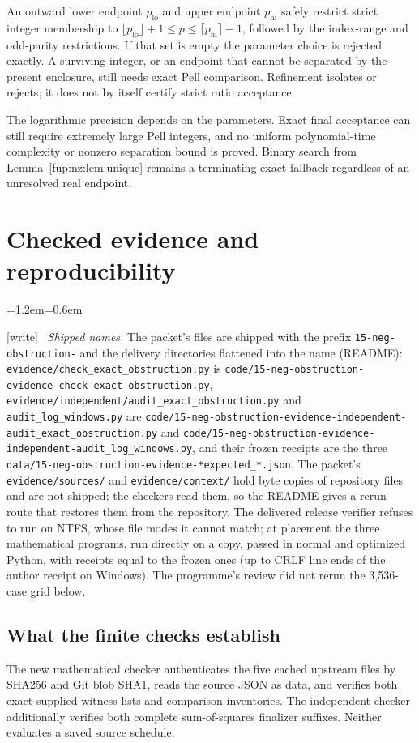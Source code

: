 \documentclass[11pt,letterpaper]{article}
\theoremstyle{definition}\newtheorem{definition}[theorem]{Definition}
\theoremstyle{remark}\newtheorem{remark}[theorem]{Remark}
\newcommand{\wtag}{\textup{[write]}}
\newenvironment{writenote}{\par\smallskip\begin{list}{}{\leftmargin=1.2em\rightmargin=0.6em}\item[]\small\wtag\ }{\end{list}\smallskip}
\newcommand{\rw}[1]{\nolinkurl{#1}}%
\begin{document}
An outward lower endpoint $p_{\mathrm{lo}}$ and upper endpoint $p_{\mathrm{hi}}$ safely restrict strict integer membership to $\lfloor p_{\mathrm{lo}}\rfloor+1\le p\le\lceil p_{\mathrm{hi}}\rceil-1$, followed by the index-range and odd-parity restrictions. If that set is empty the parameter choice is rejected exactly. A surviving integer, or an endpoint that cannot be separated by the present enclosure, still needs exact Pell comparison. Refinement isolates or rejects; it does not by itself certify strict ratio acceptance.

The logarithmic precision depends on the parameters. Exact final acceptance can still require extremely large Pell integers, and no uniform polynomial-time complexity or nonzero separation bound is proved. Binary search from Lemma~\ref{fup:nz:lem:unique} remains a terminating exact fallback regardless of an unresolved real endpoint.

\section{Checked evidence and reproducibility}\label{fup:nz:sec:checks}
\begin{writenote}
\emph{Shipped names.} The packet's files are shipped with the prefix \texttt{15-neg-obstruction-} and the delivery directories flattened into the name (README): \rw{evidence/check_exact_obstruction.py} is \rw{code/15-neg-obstruction-evidence-check_exact_obstruction.py}, \rw{evidence/independent/audit_exact_obstruction.py} and \rw{audit_log_windows.py} are \rw{code/15-neg-obstruction-evidence-independent-audit_exact_obstruction.py} and \rw{code/15-neg-obstruction-evidence-independent-audit_log_windows.py}, and their frozen receipts are the three \rw{data/15-neg-obstruction-evidence-*expected_*.json}. The packet's \rw{evidence/sources/} and \rw{evidence/context/} hold byte copies of repository files and are not shipped; the checkers read them, so the README gives a rerun route that restores them from the repository. The delivered release verifier refuses to run on NTFS, whose file modes it cannot match; at placement the three mathematical programs, run directly on a copy, passed in normal and optimized Python, with receipts equal to the frozen ones (up to CRLF line ends of the author receipt on Windows). The programme's review did not rerun the 3,536-case grid below.
\end{writenote}
\subsection{What the finite checks establish}
The new mathematical checker authenticates the five cached upstream files by SHA256 and Git blob SHA1, reads the source JSON as data, and verifies both exact supplied witness lists and comparison inventories. The independent checker additionally verifies both complete sum-of-squares finalizer suffixes. Neither evaluates a saved source schedule.
\end{document}

